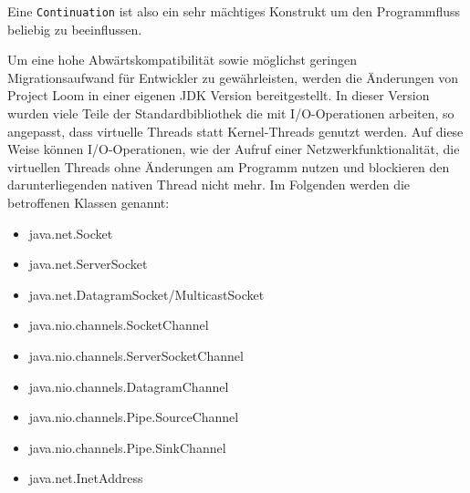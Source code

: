 Eine \verb|Continuation| ist also ein sehr mächtiges Konstrukt um den Programmfluss beliebig zu beeinflussen.

Um eine hohe Abwärtskompatibilität sowie möglichst geringen Migrationsaufwand für Entwickler zu gewährleisten, werden die Änderungen von
Project Loom in einer eigenen JDK Version bereitgestellt.
In dieser Version wurden viele Teile der Standardbibliothek die mit I/O-Operationen arbeiten, so angepasst, dass virtuelle Threads statt Kernel-Threads
genutzt werden. Auf diese Weise können I/O-Operationen, wie der Aufruf einer Netzwerkfunktionalität, die virtuellen Threads ohne Änderungen am Programm nutzen
und blockieren den darunterliegenden nativen Thread nicht mehr.
Im Folgenden werden die betroffenen Klassen genannt:\parencite{Oracle2021-Loom}

\begin{itemize}
  \item java.net.Socket
  \item java.net.ServerSocket
  \item java.net.DatagramSocket/MulticastSocket
  \item java.nio.channels.SocketChannel
  \item java.nio.channels.ServerSocketChannel
  \item java.nio.channels.DatagramChannel
  \item java.nio.channels.Pipe.SourceChannel
  \item java.nio.channels.Pipe.SinkChannel
  \item java.net.InetAddress
\end{itemize}